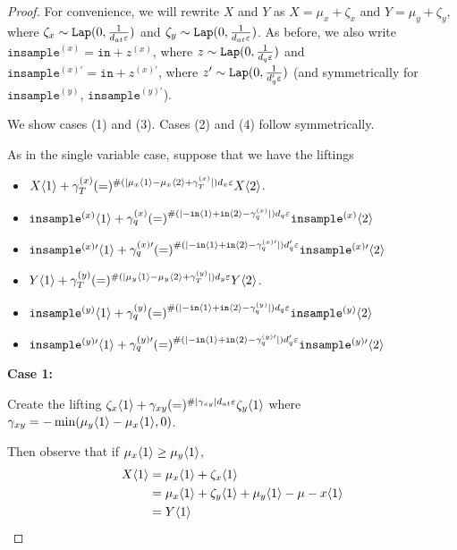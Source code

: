 \begin{proof}
    For convenience, we will rewrite $X$ and $Y$ as $X = \mu_x + \zeta_x$ and $Y = \mu_y + \zeta_y$, where $\zeta_x \sim\texttt{Lap}(0, \frac{1}{d_{at}\varepsilon})$ and $\zeta_y \sim\texttt{Lap}(0, \frac{1}{d_{at}\varepsilon})$. 
    As before, we also write $\texttt{insample}^{(x)} = \texttt{in} + z^{(x)}$, where $z\sim\texttt{Lap}(0, \frac{1}{d_q\varepsilon})$ and $\texttt{insample}^{(x)\prime} = \texttt{in} + z^{(x)\prime}$, where $z'\sim\texttt{Lap}(0, \frac{1}{d_q'\varepsilon})$ (and symmetrically for $\texttt{insample}^{(y)}$, $\texttt{insample}^{(y)\prime}$).

    We show cases (1) and (3). Cases (2) and (4) follow symmetrically. 

    As in the single variable case, suppose that we have the liftings
    \begin{itemize}
        \item $X\langle1 \rangle+\gamma_T^{(x)} (=)^{\#(|\mu_x\langle1 \rangle-\mu_x\langle2 \rangle+\gamma_T^{(x)}|)d_x\varepsilon}X\langle2 \rangle$.
        \item $\texttt{insample}^{(x)}\langle1 \rangle +\gamma_q^{(x)}{(=)}^{\#(|-\texttt{in}\langle1 \rangle+\texttt{in}\langle2 \rangle-\gamma_q^{(x)}|)d_q\varepsilon}\texttt{insample}^{(x)}\langle2 \rangle$
        \item $\texttt{insample}^{(x)\prime}\langle1 \rangle +\gamma_q^{(x)\prime}{(=)}^{\#(|-\texttt{in}\langle1 \rangle+\texttt{in}\langle2 \rangle-\gamma_q^{(x)\prime}|)d_q'\varepsilon}\texttt{insample}^{(x)\prime}\langle2 \rangle$
        \item $Y\langle1 \rangle+\gamma_T^{(y)} (=)^{\#(|\mu_y\langle1 \rangle-\mu_y\langle2 \rangle+\gamma_T^{(y)}|)d_y\varepsilon}Y\langle2 \rangle$.
        \item $\texttt{insample}^{(y)}\langle1 \rangle +\gamma_q^{(y)}{(=)}^{\#(|-\texttt{in}\langle1 \rangle+\texttt{in}\langle2 \rangle-\gamma_q^{(y)}|)d_q\varepsilon}\texttt{insample}^{(y)}\langle2 \rangle$
        \item $\texttt{insample}^{(y)\prime}\langle1 \rangle +\gamma_q^{(y)\prime}{(=)}^{\#(|-\texttt{in}\langle1 \rangle+\texttt{in}\langle2 \rangle-\gamma_q^{(y)\prime}|)d_q'\varepsilon}\texttt{insample}^{(y)\prime}\langle2 \rangle$
    \end{itemize}

    \textbf{Case 1:}

    Create the lifting $\zeta_x\langle1 \rangle +\gamma_{xy}(=)^{\#|\gamma_{xy}|d_{at}\varepsilon}\zeta_y\langle1 \rangle$ where $\gamma_{xy} = -\min(\mu_y\langle1 \rangle-\mu_x\langle1 \rangle, 0)$. 

    Then observe that if $\mu_x\langle1 \rangle\geq \mu_y\langle1 \rangle$, \begin{align*}
        X\langle1 \rangle&= \mu_x\langle1 \rangle + \zeta_x\langle1 \rangle\\
        &= \mu_x\langle1 \rangle + \zeta_y\langle1 \rangle+\mu_y\langle1 \rangle-\mu-x\langle1 \rangle\\
        &=Y\langle1 \rangle
    \end{align*}


\end{proof}
